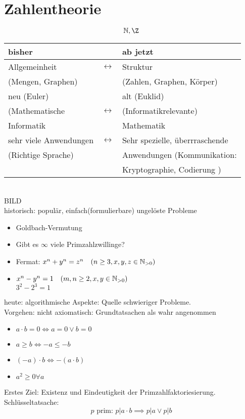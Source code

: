 \chapter{Zahlentheorie}
\[ \N , \Z \]
\begin{tabular}{ l c l }
	bisher				&				&ab jetzt					\\ \hline
	Allgemeinheit			&$\leftrightarrow$	&Struktur					\\
	(Mengen, Graphen)		&				&(Zahlen, Graphen, Körper)		\\ \hline
	neu (Euler)				&				&alt (Euklid)				\\ \hline
	(Mathematische			&$\leftrightarrow$	&(Informatikrelevante)			\\
	Informatik				&				&Mathematik				\\ \hline
	sehr viele Anwendungen	&$\leftrightarrow$	&Sehr spezielle, überrraschende	\\
	(Richtige Sprache)		&				&Anwendungen (Kommunikation:	\\
						&				&Kryptographie, Codierung )		
\end{tabular} \\
BILD \\
historisch: populär, einfach(formulierbare) ungelöste Probleme
\begin{itemize}
	\item Goldbach-Vermutung
	\item Gibt es $\infty$ viele Primzahlzwillinge?
	\item Fermat: $x^n + y^n = z^n \quad (n \geq 3 , x, y, z \in \mathbb{N}_{> 0} )$
	\item $x^n - y^n = 1 \quad (m, n \geq 2 , x, y \in \mathbb{N}_{> 0} )$\\
		$3^2 - 2^3 = 1$
\end{itemize}
heute: algorithmische Aspekte: Quelle schwieriger Probleme. \\
Vorgehen: nicht axiomatisch: Grundtatsachen als wahr angenommen\\
\begin{bsp*}
	\begin{itemize}
		\item $a \cdot b = 0 \iff a = 0 \vee b = 0$
		\item $a \geq b \iff -a \leq -b$
		\item $(-a) \cdot b \iff -(a \cdot b)$
		\item $a^2 \geq 0 \forall a$
	\end{itemize}
\end{bsp*}
Erstes Ziel: Existenz und Eindeutigkeit der Primzahlfaktoriesierung. \\
Schlüsseltatsache:
\[ p \text{ prim: } p | a \cdot b \implies p | a \vee p | b \]
